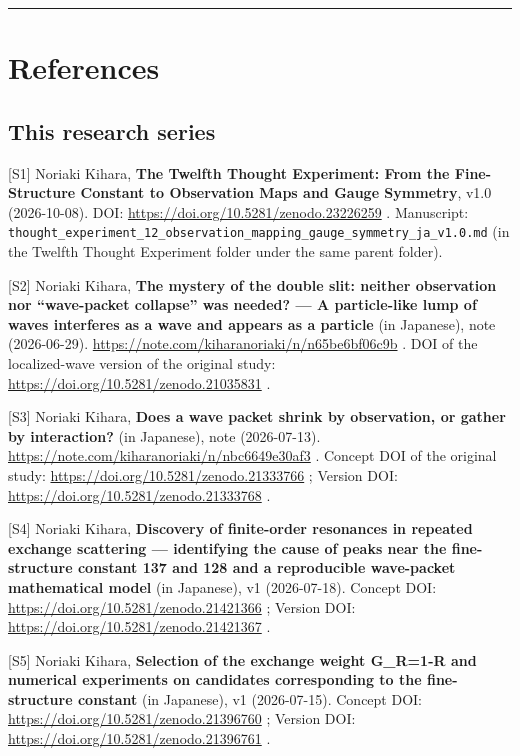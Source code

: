 \documentclass[
  a4paper,
]{article}
\begin{document}
\begin{center}\rule{0.5\linewidth}{0.5pt}\end{center}

\section{References}\label{references}

\subsection{This research series}\label{this-research-series}

{[}S1{]} Noriaki Kihara, \textbf{The Twelfth Thought Experiment: From
the Fine-Structure Constant to Observation Maps and Gauge Symmetry},
v1.0 (2026-10-08). DOI: \url{https://doi.org/10.5281/zenodo.23226259} .
Manuscript:
\texttt{thought\_\allowbreak{}experiment\_\allowbreak{}12\_\allowbreak{}observation\_\allowbreak{}mapping\_\allowbreak{}gauge\_\allowbreak{}symmetry\_\allowbreak{}ja\_\allowbreak{}v1.0.md}
(in the Twelfth Thought Experiment folder under the same parent folder).

{[}S2{]} Noriaki Kihara, \textbf{The mystery of the double slit: neither
observation nor ``wave-packet collapse'' was needed? --- A particle-like
lump of waves interferes as a wave and appears as a particle} (in
Japanese), note (2026-06-29).
\url{https://note.com/kiharanoriaki/n/n65be6bf06c9b} . DOI of the
localized-wave version of the original study:
\url{https://doi.org/10.5281/zenodo.21035831} .

{[}S3{]} Noriaki Kihara, \textbf{Does a wave packet shrink by
observation, or gather by interaction?} (in Japanese), note
(2026-07-13). \url{https://note.com/kiharanoriaki/n/nbc6649e30af3} . Concept
DOI of the original study: \url{https://doi.org/10.5281/zenodo.21333766} ;
Version DOI: \url{https://doi.org/10.5281/zenodo.21333768} .

{[}S4{]} Noriaki Kihara, \textbf{Discovery of finite-order resonances in
repeated exchange scattering --- identifying the cause of peaks near the
fine-structure constant 137 and 128 and a reproducible wave-packet
mathematical model} (in Japanese), v1 (2026-07-18). Concept DOI:
\url{https://doi.org/10.5281/zenodo.21421366} ; Version DOI:
\url{https://doi.org/10.5281/zenodo.21421367} .

{[}S5{]} Noriaki Kihara, \textbf{Selection of the exchange weight
G\_R=1-R and numerical experiments on candidates corresponding to the
fine-structure constant} (in Japanese), v1 (2026-07-15). Concept DOI:
\url{https://doi.org/10.5281/zenodo.21396760} ; Version DOI:
\url{https://doi.org/10.5281/zenodo.21396761} .
\end{document}
